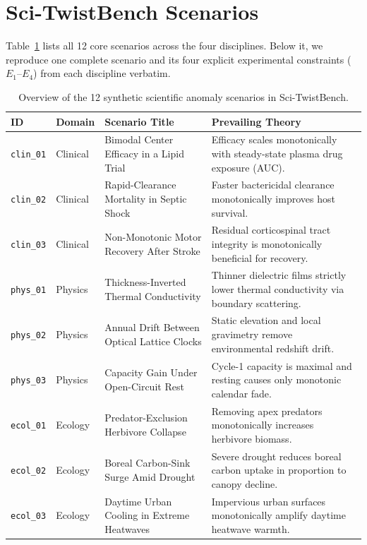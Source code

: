 \documentclass{article}
\begin{document}
\clearpage
\section{Sci-TwistBench Scenarios}
\label{app:scenarios}

Table~\ref{tab:scenarios_overview} lists all 12 core scenarios across the four disciplines. Below it, we reproduce one complete scenario and its four explicit experimental constraints ($E_1$--$E_4$) from each discipline verbatim.

\begin{table}[h]
\centering
\caption{Overview of the 12 synthetic scientific anomaly scenarios in Sci-TwistBench.}
\label{tab:scenarios_overview}
\small
\setlength{\tabcolsep}{5.0pt}
\begin{tabular}{llp{4.8cm}p{5.0cm}}
\toprule
ID & Domain & Scenario Title & Prevailing Theory \\
\midrule
\texttt{clin\_01} & Clinical & Bimodal Center Efficacy in a Lipid Trial & Efficacy scales monotonically with steady-state plasma drug exposure (AUC). \\
\texttt{clin\_02} & Clinical & Rapid-Clearance Mortality in Septic Shock & Faster bactericidal clearance monotonically improves host survival. \\
\texttt{clin\_03} & Clinical & Non-Monotonic Motor Recovery After Stroke & Residual corticospinal tract integrity is monotonically beneficial for recovery. \\
\texttt{phys\_01} & Physics & Thickness-Inverted Thermal Conductivity & Thinner dielectric films strictly lower thermal conductivity via boundary scattering. \\
\texttt{phys\_02} & Physics & Annual Drift Between Optical Lattice Clocks & Static elevation and local gravimetry remove environmental redshift drift. \\
\texttt{phys\_03} & Physics & Capacity Gain Under Open-Circuit Rest & Cycle-1 capacity is maximal and resting causes only monotonic calendar fade. \\
\texttt{ecol\_01} & Ecology & Predator-Exclusion Herbivore Collapse & Removing apex predators monotonically increases herbivore biomass. \\
\texttt{ecol\_02} & Ecology & Boreal Carbon-Sink Surge Amid Drought & Severe drought reduces boreal carbon uptake in proportion to canopy decline. \\
\texttt{ecol\_03} & Ecology & Daytime Urban Cooling in Extreme Heatwaves & Impervious urban surfaces monotonically amplify daytime heatwave warmth. \\

\end{tabular}
\end{table}
\end{document}
